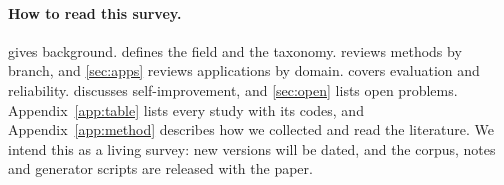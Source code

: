 

\paragraph{How to read this survey.}  gives background.  defines the field and the taxonomy.  reviews methods by branch, and \cref{sec:apps} reviews applications by domain.  covers evaluation and reliability.  discusses self-improvement, and \cref{sec:open} lists open problems. Appendix~\ref{app:table} lists every study with its codes, and Appendix~\ref{app:method} describes how we collected and read the literature. We intend this as a living survey: new versions will be dated, and the corpus, notes and generator scripts are released with the paper.
